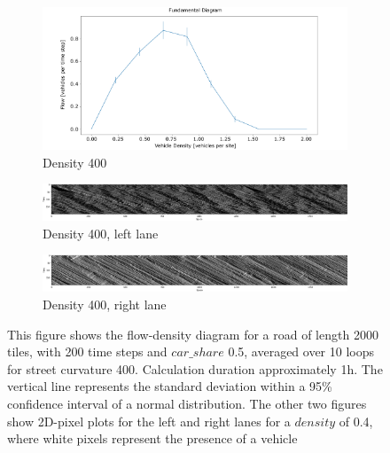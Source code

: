\begin{figure}
     \centering
    \begin{subfigure}[b]{0.8\textwidth}
        \centering
        \includegraphics[width=\textwidth]{images/flow_density401_half_bike.png.png}
        \caption{Density 400}
    \end{subfigure}

    \begin{subfigure}[b]{1.0\textwidth}
        \centering
        \includegraphics[width=\textwidth]{images/2D_401_half_bike_left.png}
        \caption{Density 400, left lane}
    \end{subfigure}

    \begin{subfigure}[b]{1.0\textwidth}
        \centering
        \includegraphics[width=\textwidth]{images/2D_401_half_bike_right.png}
        \caption{Density 400, right lane}
    \end{subfigure}
    \caption{This figure shows the flow-density diagram for a road of length 2000 tiles, with 200 time steps and $car\_share$ 0.5, averaged over 10 loops for street curvature 400. Calculation duration approximately 1h. The vertical line represents the standard deviation within a 95\% confidence interval of a normal distribution. The other two figures show 2D-pixel plots for the left and right lanes for a $density$ of 0.4, where white pixels represent the presence of a vehicle}
    \label{fig:flow_density401_half_bike}
\end{figure}

